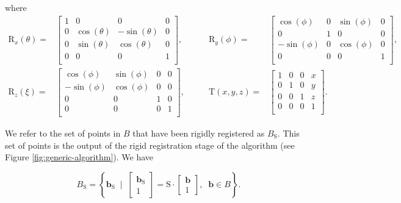 \documentclass[12pt]{article}
\begin{document}
where
$$
\begin{align*}
    \mathrm{R}_x(\theta) =&
    \begin{bmatrix}
        1 & 0 & 0 & 0\\
        0 & \cos(\theta) & -\sin(\theta) & 0\\
        0 & \sin(\theta) & \cos(\theta) & 0\\
        0 & 0 & 0 & 1\\
    \end{bmatrix},&\quad\quad
    \mathrm{R}_y(\phi) =&
    \begin{bmatrix}
        \cos(\phi) & 0 & \sin(\phi) & 0\\
        0 & 1 & 0 & 0\\
        -\sin(\phi) & 0 & \cos(\phi) & 0\\
        0 & 0 & 0 & 1\\
    \end{bmatrix},
    \\
    \mathrm{R}_z(\xi) =&
    \begin{bmatrix}
        \cos(\phi) & \sin(\phi) & 0 & 0\\
        -\sin(\phi) & \cos(\phi) & 0 & 0\\
        0 & 0 & 1 & 0\\
        0 & 0 & 0 & 1\\
    \end{bmatrix},&\quad\quad
    \mathrm{T}(x, y, z) =&
    \begin{bmatrix}
        1 & 0 & 0 & x\\
        0 & 1 & 0 & y\\
        0 & 0 & 1 & z\\
        0 & 0 & 0 & 1\\
    \end{bmatrix}.
\end{align*}
$$

We refer to the set of points in $B$ that have been rigidly registered as $B_\textrm{S}$.  This set of points is the output of the rigid registration stage of the algorithm (see Figure \ref{fig:generic-algorithm}).  We have

$$
B_\textrm{S} = \left\{ \mathbf{b}_\textrm{S} \;\; \Big| \;\; \begin{bmatrix} \mathbf{b}_\textrm{S} \\ 1 \end{bmatrix} = \mathrm{S} \cdot \begin{bmatrix} \mathbf{b} \\ 1 \end{bmatrix} , \;\; \mathbf{b} \in B \right\}.
$$
\end{document}
